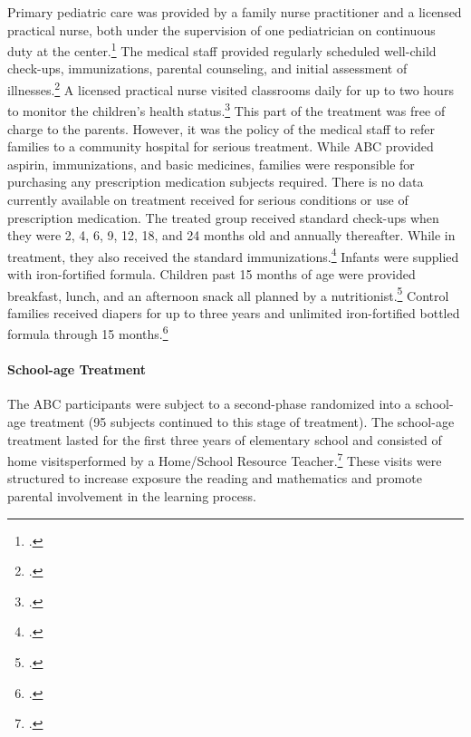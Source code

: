 \begin{appendices}
\noindent Primary pediatric care was provided by a family nurse practitioner and a licensed practical nurse, both under the supervision of one pediatrician on continuous duty at the center.\footnote{\citet{Haskins-et-al_1978_JoPP}.} The medical staff provided regularly scheduled well-child check-ups, immunizations, parental counseling, and initial assessment of illnesses.\footnote{\citet{Ramey-et-al_1977_Intro-to-ABC}.} A licensed practical nurse visited classrooms daily for up to two hours to monitor the children's health status.\footnote{\citet{Sanyal_Henderson_etal_1980_JoPediatrics}.} This part of the treatment was free of charge to the parents. However, it was the policy of the medical staff to refer families to a community hospital for serious treatment. While ABC provided aspirin, immunizations, and basic medicines, families were responsible for purchasing any prescription medication subjects required. There is no data currently available on treatment received for serious conditions or use of prescription medication. The treated group received standard check-ups when they were 2, 4, 6, 9, 12, 18, and 24 months old and annually thereafter. While in treatment, they also received the standard immunizations.\footnote{\citet{Campbell_Conti_etal_2014_EarlyChildhoodInvestments}.} Infants were supplied with iron-fortified formula. Children past 15 months of age were provided breakfast, lunch, and an
afternoon snack all planned by a nutritionist.\footnote{\citet{Campbell_Conti_etal_2014_EarlyChildhoodInvestments,abc2014-2015interviews}.} Control families received diapers for up to three years and unlimited iron-fortified bottled formula through 15 months.\footnote{\citet{Ramey_Collier_etal_1976_CarolinaAbecedarianProject,Ramey_Campbell_1979_SR}.}

\paragraph{School-age Treatment}

\noindent The ABC participants were subject to a second-phase randomized into a school-age treatment (95 subjects continued to this stage of treatment). The school-age treatment lasted for the first three years of elementary school and consisted of home visitsperformed by a Home/School Resource Teacher.\footnote{\cite{Burchinal_Campbell_etal_1997_CD}.} These visits were structured to increase exposure the reading and mathematics and promote parental involvement in the learning process.\\


\end{appendices}
